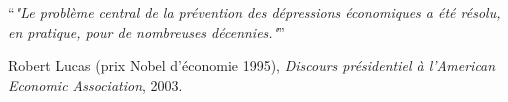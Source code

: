 \documentclass[12pt,a4paper]{article}
\begin{document}
\newpage


\newpage

\pagestyle{plain}

\vspace*{0.2\textheight}

\noindent \enquote{\itshape "Le problème central de la prévention des dépressions économiques a été résolu, en pratique, pour de nombreuses décennies."}\bigbreak

\hfill Robert Lucas (prix Nobel d'économie 1995), \textit{Discours présidentiel à l'American Economic Association}, 2003.

\newpage


\end{document}
